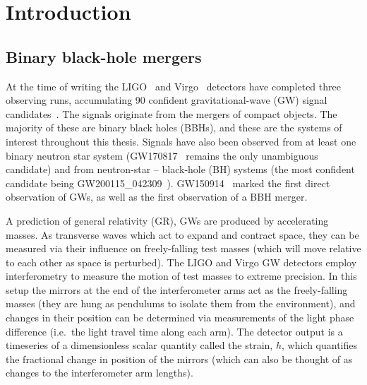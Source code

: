 
\chapter{Introduction}
\label{Chapter1}

\section{Binary black-hole mergers}

At the time of writing the 
LIGO~\cite{LIGOScientific:2014pky} and Virgo~\cite{VIRGO:2014yos} detectors have completed three observing runs, accumulating 90 confident gravitational-wave (GW) signal candidates~\cite{LIGOScientific:2018mvr, LIGOScientific:2020ibl, LIGOScientific:2021usb, LIGOScientific:2021djp}.
The signals originate from the mergers of compact objects. 
The majority of these are binary black holes (BBHs), and these are the systems of interest throughout this thesis.  
Signals have also been observed from at least one binary neutron star system (GW170817~\cite{LIGOScientific:2017vwq} remains the only unambiguous candidate) and from neutron-star -- black-hole (BH) systems (the most confident candidate being GW200115\_042309~\cite{LIGOScientific:2021qlt}).
GW150914~\cite{LIGOScientific:2016aoc} marked the first direct observation of GWs, as well as the first observation of a BBH merger.

A prediction of general relativity (GR), GWs are produced by accelerating masses.
As transverse waves which act to expand and contract space, they can be measured via their influence on freely-falling test masses (which will move relative to each other as space is perturbed).
The LIGO and Virgo GW detectors employ interferometry to measure the motion of test masses to extreme precision. 
In this setup the mirrors at the end of the interferometer arms act as the freely-falling masses (they are hung as pendulums to isolate them from the environment), and changes in their position can be determined via measurements of the light phase difference (i.e.\ the light travel time along each arm).
The detector output is a timeseries of a dimensionless scalar quantity called the strain, $h$, which quantifies the fractional change in position of the mirrors (which can also be thought of as changes to the interferometer arm lengths).

